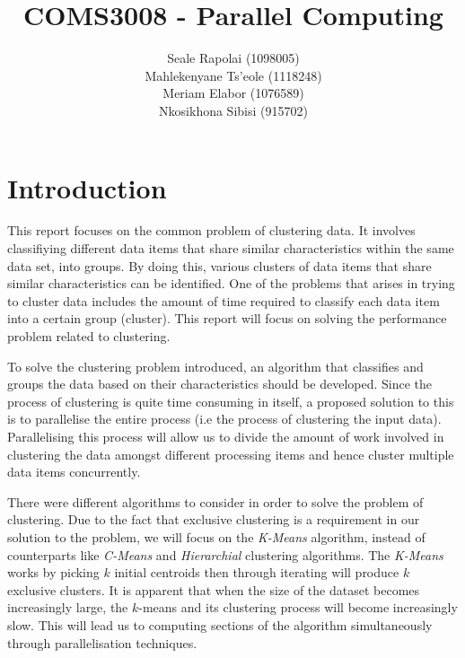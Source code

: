 \documentclass[12pt]{article}
\begin{document}
	\title{COMS3008 - Parallel Computing}
	\author{Seale Rapolai (1098005)
          \\ Mahlekenyane Ts'eole (1118248)
          \\ Meriam Elabor (1076589)
          \\ Nkosikhona Sibisi (915702)
    }
	\maketitle

	\section{Introduction}
    	\begin{flushleft}
      		This report focuses on the common problem of clustering data. It involves classifiying different data items that share similar characteristics within the same data set, into groups. By doing this, various clusters of data items that share similar characteristics can be identified. One of the problems that arises in trying to cluster data includes the amount of time required to classify each data item into a certain group (cluster). This report will focus on solving the performance problem related to clustering.
    	\end{flushleft}

      	\begin{flushleft}
        	  To solve the clustering problem introduced, an algorithm that classifies and groups the data based on their characteristics should be developed. Since the process of clustering is quite time consuming in itself, a proposed solution to this is to parallelise the entire process (i.e the process of clustering the input data). Parallelising this process will allow us to divide the amount of work involved in clustering the data amongst different processing items and hence cluster multiple data items concurrently.
      	\end{flushleft}

      	\begin{flushleft}
        	There were different algorithms to consider in order to solve the problem of clustering. Due to the fact that exclusive clustering is a requirement in our solution to the problem, we will focus on the \textit{K-Means} algorithm, instead of counterparts like \textit{C-Means} and \textit{Hierarchial} clustering algorithms. The \textit{K-Means} works by picking $k$ initial centroids then through iterating will produce $k$ exclusive clusters. It is apparent that when the size of the dataset becomes increasingly large, the $k$-means and its clustering process will become increasingly slow. This will lead us to computing sections of the algorithm simultaneously through parallelisation techniques.
      	\end{flushleft}
\end{document}
